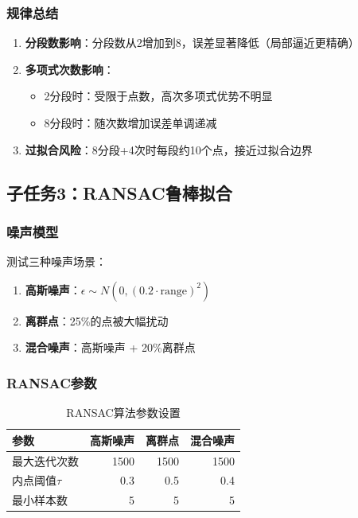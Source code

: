 \documentclass[a4paper,12pt]{article}
\theoremstyle{definition}
\begin{document}
\subsubsection{规律总结}

\begin{enumerate}
    \item \textbf{分段数影响}：分段数从2增加到8，误差显著降低（局部逼近更精确）
    \item \textbf{多项式次数影响}：
    \begin{itemize}
        \item 2分段时：受限于点数，高次多项式优势不明显
        \item 8分段时：随次数增加误差单调递减
    \end{itemize}
    \item \textbf{过拟合风险}：8分段+4次时每段约10个点，接近过拟合边界
\end{enumerate}

\subsection{子任务3：RANSAC鲁棒拟合}

\subsubsection{噪声模型}

测试三种噪声场景：
\begin{enumerate}
    \item \textbf{高斯噪声}：$\epsilon \sim N(0, (0.2 \cdot \text{range})^2)$
    \item \textbf{离群点}：25\%的点被大幅扰动
    \item \textbf{混合噪声}：高斯噪声 + 20\%离群点
\end{enumerate}

\subsubsection{RANSAC参数}

\begin{table}[h]
\centering
\caption{RANSAC算法参数设置}
\begin{tabular}{lrrr}
\toprule
\textbf{参数} & \textbf{高斯噪声} & \textbf{离群点} & \textbf{混合噪声} \\
\midrule
最大迭代次数 & 1500 & 1500 & 1500 \\
内点阈值$\tau$ & 0.3 & 0.5 & 0.4 \\
最小样本数 & 5 & 5 & 5 \\
\bottomrule
\end{tabular}
\end{table}
\end{document}
